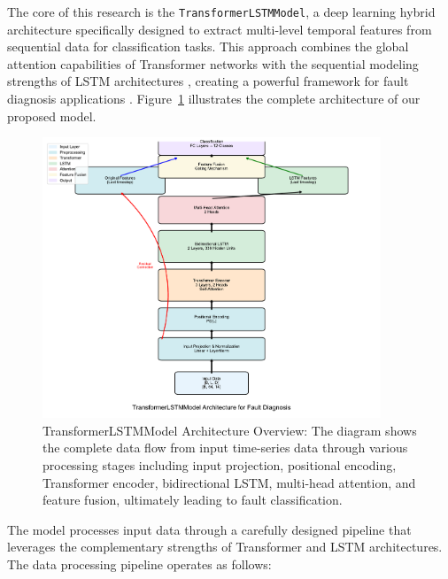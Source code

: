 The core of this research is the \texttt{TransformerLSTMModel}, a deep learning hybrid architecture specifically designed to extract multi-level temporal features from sequential data for classification tasks. This approach combines the global attention capabilities of Transformer networks \citep{vaswani2017attention} with the sequential modeling strengths of LSTM architectures \citep{hochreiter1997long}, creating a powerful framework for fault diagnosis applications \citep{zhang2019deep, zhao2019deep}. Figure~\ref{fig:hybrid_architecture} illustrates the complete architecture of our proposed model.

\begin{figure}[h]
\centering
\includegraphics[width=0.9\textwidth]{logos/hybrid_architecture.pdf}
\caption{TransformerLSTMModel Architecture Overview: The diagram shows the complete data flow from input time-series data through various processing stages including input projection, positional encoding, Transformer encoder, bidirectional LSTM, multi-head attention, and feature fusion, ultimately leading to fault classification.}
\label{fig:hybrid_architecture}
\end{figure}

The model processes input data through a carefully designed pipeline that leverages the complementary strengths of Transformer and LSTM architectures. The data processing pipeline operates as follows:


